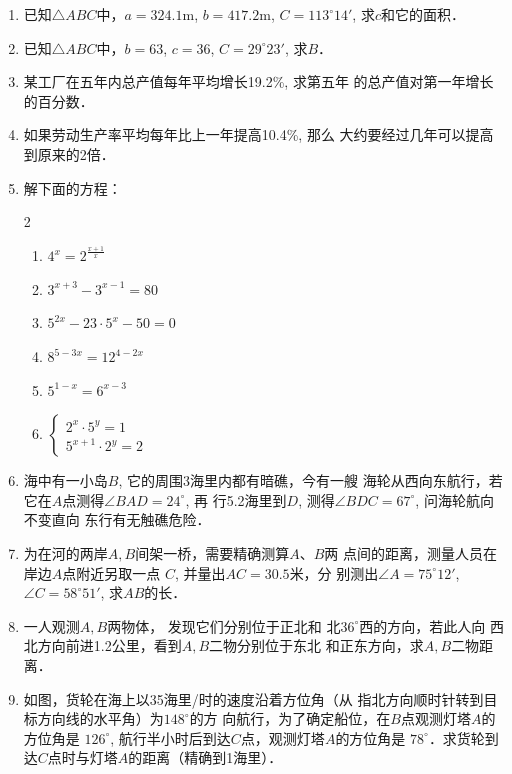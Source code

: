 \begin{enumerate}
\item 已知$\triangle ABC$中，$a=324.1$m, $b=417.2$m, $C=113^{\circ}14'$,
求$c$和它的面积．
\item 已知$\triangle ABC$中，$b=63$, $c=36$, $C=29^{\circ}23'$, 求$B$．
\item 某工厂在五年内总产值每年平均增长19.2\%, 求第五年
的总产值对第一年增长的百分数．
\item 如果劳动生产率平均每年比上一年提高10.4\%, 那么
大约要经过几年可以提高到原来的2倍．
\item 解下面的方程：
\begin{multicols}{2}
\begin{enumerate}
    \item $4^{x}=2^{\tfrac{x+1}{x}}$
    \item $3^{x+3}-3^{x-1}=80$
    \item $5^{2x}-23\cdot 5^x-50=0$
    \item $8^{5-3x}=12^{4-2x}$
    \item $5^{1-x}=6^{x-3}$
    \item $\begin{cases}
        2^x\cdot 5^y=1\\
        5^{x+1}\cdot 2^y=2
    \end{cases}$
\end{enumerate}
\end{multicols}

\item 海中有一小岛$B$, 它的周围3海里内都有暗礁，今有一艘
海轮从西向东航行，若它在$A$点测得$\angle BAD=24^{\circ}$, 再
行5.2海里到$D$, 测得$\angle BDC=67^{\circ}$, 问海轮航向不变直向
东行有无触礁危险．
\item 为在河的两岸$A,B$间架一桥，需要精确测算$A$、$B$两
点间的距离，测量人员在
岸边$A$点附近另取一点
$C$, 并量出$AC=30.5$米，分
别测出$\angle A=75^{\circ}12'$, 
$\angle C=58^{\circ}51'$, 求$AB$的长．
\item 一人观测$A,B$两物体，
发现它们分别位于正北和
北$36^{\circ}$西的方向，若此人向
西北方向前进1.2公里，看到$A,B$二物分别位于东北
和正东方向，求$A,B$二物距离．
\item  如图，货轮在海上以35海里/时的速度沿着方位角（从
指北方向顺时针转到目标方向线的水平角）为$148^{\circ}$的方
向航行，为了确定船位，在$B$点观测灯塔$A$的方位角是
$126^{\circ}$, 航行半小时后到达$C$点，观测灯塔$A$的方位角是
$78^{\circ}$．求货轮到达$C$点时与灯塔$A$的距离（精确到1海里）．

\begin{figure}[htp]\centering
    \begin{minipage}[t]{0.48\textwidth}
    \centering
{}
\end{minipage}
\end{figure}
\end{enumerate}
